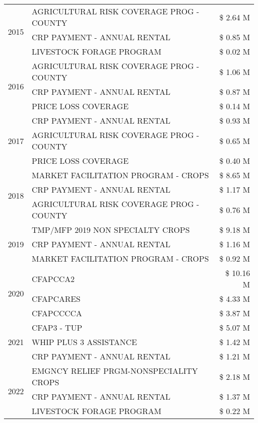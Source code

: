 \begin{tabular}{llr}
\multirow[t]{3}{*}{2015} & AGRICULTURAL RISK COVERAGE PROG - COUNTY & \$ 2.64 M \\
 & CRP PAYMENT - ANNUAL RENTAL & \$ 0.85 M \\
 & LIVESTOCK FORAGE PROGRAM & \$ 0.02 M \\
\cline{1-3}
\multirow[t]{3}{*}{2016} & AGRICULTURAL RISK COVERAGE PROG - COUNTY & \$ 1.06 M \\
 & CRP PAYMENT - ANNUAL RENTAL & \$ 0.87 M \\
 & PRICE LOSS COVERAGE & \$ 0.14 M \\
\cline{1-3}
\multirow[t]{3}{*}{2017} & CRP PAYMENT - ANNUAL RENTAL & \$ 0.93 M \\
 & AGRICULTURAL RISK COVERAGE PROG - COUNTY & \$ 0.65 M \\
 & PRICE LOSS COVERAGE & \$ 0.40 M \\
\cline{1-3}
\multirow[t]{3}{*}{2018} & MARKET FACILITATION PROGRAM - CROPS & \$ 8.65 M \\
 & CRP PAYMENT - ANNUAL RENTAL & \$ 1.17 M \\
 & AGRICULTURAL RISK COVERAGE PROG - COUNTY & \$ 0.76 M \\
\cline{1-3}
\multirow[t]{3}{*}{2019} & TMP/MFP 2019 NON SPECIALTY CROPS & \$ 9.18 M \\
 & CRP PAYMENT - ANNUAL RENTAL & \$ 1.16 M \\
 & MARKET FACILITATION PROGRAM - CROPS & \$ 0.92 M \\
\cline{1-3}
\multirow[t]{3}{*}{2020} & CFAPCCA2 & \$ 10.16 M \\
 & CFAPCARES & \$ 4.33 M \\
 & CFAPCCCCA & \$ 3.87 M \\
\cline{1-3}
\multirow[t]{3}{*}{2021} & CFAP3 - TUP & \$ 5.07 M \\
 & WHIP PLUS 3 ASSISTANCE & \$ 1.42 M \\
 & CRP PAYMENT - ANNUAL RENTAL & \$ 1.21 M \\
\cline{1-3}
\multirow[t]{3}{*}{2022} & EMGNCY RELIEF PRGM-NONSPECIALITY CROPS & \$ 2.18 M \\
 & CRP PAYMENT - ANNUAL RENTAL & \$ 1.37 M \\
 & LIVESTOCK FORAGE PROGRAM & \$ 0.22 M \\
\cline{1-3}
\bottomrule
\end{tabular}
